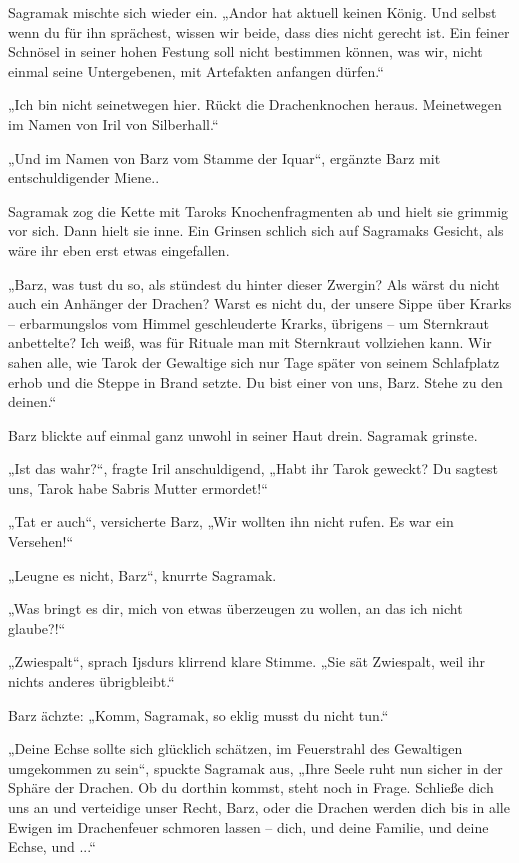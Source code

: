 Sagramak mischte sich wieder ein. „Andor hat aktuell keinen König. Und selbst wenn du für ihn sprächest, wissen wir beide, dass dies nicht gerecht ist. Ein feiner Schnösel in seiner hohen Festung soll nicht bestimmen können, was wir, nicht einmal seine Untergebenen, mit Artefakten anfangen dürfen.“

„Ich bin nicht seinetwegen hier. Rückt die Drachenknochen heraus. Meinetwegen im Namen von Iril von Silberhall.“

„Und im Namen von Barz vom Stamme der Iquar“, ergänzte Barz mit entschuldigender Miene..

Sagramak zog die Kette mit Taroks Knochenfragmenten ab und hielt sie grimmig vor sich. Dann hielt sie inne. Ein Grinsen schlich sich auf Sagramaks Gesicht, als wäre ihr eben erst etwas eingefallen.

„Barz, was tust du so, als stündest du hinter dieser Zwergin? Als wärst du nicht auch ein Anhänger der Drachen? Warst es nicht du, der unsere Sippe über Krarks – erbarmungslos vom Himmel geschleuderte Krarks, übrigens – um Sternkraut anbettelte? Ich weiß, was für Rituale man mit Sternkraut vollziehen kann. Wir sahen alle, wie Tarok der Gewaltige sich nur Tage später von seinem Schlafplatz erhob und die Steppe in Brand setzte. Du bist einer von uns, Barz. Stehe zu den deinen.“

Barz blickte auf einmal ganz unwohl in seiner Haut drein. Sagramak grinste.

„Ist das wahr?“, fragte Iril anschuldigend, „Habt ihr Tarok geweckt? Du sagtest uns, Tarok habe Sabris Mutter ermordet!“

„Tat er auch“, versicherte Barz, „Wir wollten ihn nicht rufen. Es war ein Versehen!“

„Leugne es nicht, Barz“, knurrte Sagramak.

„Was bringt es dir, mich von etwas überzeugen zu wollen, an das ich nicht glaube?!“

„Zwiespalt“, sprach Ijsdurs klirrend klare Stimme. „Sie sät Zwiespalt, weil ihr nichts anderes übrigbleibt.“

Barz ächzte: „Komm, Sagramak, so eklig musst du nicht tun.“

„Deine Echse sollte sich glücklich schätzen, im Feuerstrahl des Gewaltigen umgekommen zu sein“, spuckte Sagramak aus, „Ihre Seele ruht nun sicher in der Sphäre der Drachen. Ob du dorthin kommst, steht noch in Frage. Schließe dich uns an und verteidige unser Recht, Barz, oder die Drachen werden dich bis in alle Ewigen im Drachenfeuer schmoren lassen – dich, und deine Familie, und deine Echse, und ...“

